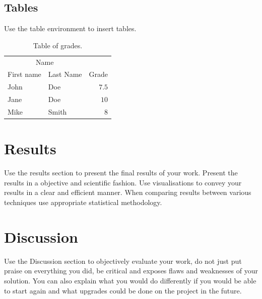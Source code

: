 \documentclass[fleqn,oneauthor,9pt]{ds_report}
\begin{document}
\subsection*{Tables}

Use the table environment to insert tables.

\begin{table}[hbt]
  \caption{Table of grades.}
  \centering
  \begin{tabular}{l l | r}
    \toprule
    \multicolumn{2}{c}{Name} \\
    \cmidrule(r){1-2}
    First name & Last Name & Grade \\
    \midrule
    John & Doe & $7.5$ \\
    Jane & Doe & $10$ \\
    Mike & Smith & $8$ \\
    \bottomrule
  \end{tabular}
  \label{tab:label}
\end{table}


\section*{Results}

Use the results section to present the final results of your work. Present the results in a objective and scientific fashion. Use visualisations to convey your results in a clear and efficient manner. When comparing results between various techniques use appropriate statistical methodology.


\section*{Discussion}

Use the Discussion section to objectively evaluate your work, do not just put praise on everything you did, be critical and exposes flaws and weaknesses of your solution. You can also explain what you would do differently if you would be able to start again and what upgrades could be done on the project in the future.
\end{document}
